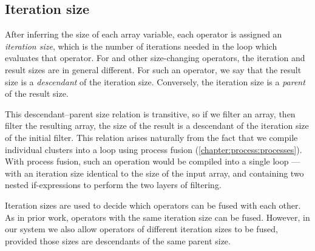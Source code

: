 % 


\subsection{Iteration size}
After inferring the size of each array variable, each operator is assigned an \emph{iteration size}, which is the number of iterations needed in the loop which evaluates that operator.
For \Hs@filter@ and other size-changing operators, the iteration and result sizes are in general different.
For such an operator, we say that the result size is a \emph{descendant} of the iteration size.
Conversely, the iteration size is a \emph{parent} of the result size. 

This descendant--parent size relation is transitive, so if we filter an array, then filter the resulting array, the size of the result is a descendant of the iteration size of the initial filter.
This relation arises naturally from the fact that we compile individual clusters into a loop using process fusion (\cref{chapter:process:processes}).
With process fusion, such an operation would be compiled into a single loop --- with an iteration size identical to the size of the input array, and containing two nested if-expressions to perform the two layers of filtering.

Iteration sizes are used to decide which operators can be fused with each other.
As in prior work, operators with the same iteration size can be fused.
However, in our system we also allow operators of different iteration sizes to be fused, provided those sizes are descendants of the same parent size.

